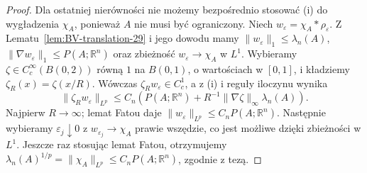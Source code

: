 \begin{proof}
Dla ostatniej nierówności nie możemy bezpośrednio
stosować (i) do wygładzenia $\chi_A$, ponieważ
$A$ nie musi być ograniczony. Niech
$w_\varepsilon=\chi_A*\rho_\varepsilon$.
Z Lematu~\ref{lem:BV-translation-29} i jego dowodu
mamy $\|w_\varepsilon\|_1\le\lambda_n(A)$,
$\|\nabla w_\varepsilon\|_1\le P(A;\mathbb R^n)$
oraz zbieżność $w_\varepsilon\to\chi_A$ w $L^1$.
Wybieramy $\zeta\in C_c^\infty(B(0,2))$
równą $1$ na $B(0,1)$, o wartościach w $[0,1]$,
i kładziemy $\zeta_R(x)=\zeta(x/R)$.
Wówczas $\zeta_R w_\varepsilon\in C_c^1$,
a z (i) i reguły iloczynu wynika
\[
 \|\zeta_R w_\varepsilon\|_{L^p}
 \le C_n\left(P(A;\mathbb R^n)
 +R^{-1}\|\nabla\zeta\|_\infty\lambda_n(A)\right).
\]
Najpierw $R\to\infty$; lemat Fatou daje
$\|w_\varepsilon\|_{L^p}\le C_nP(A;\mathbb R^n)$.
Następnie wybieramy $\varepsilon_j\downarrow0$
z $w_{\varepsilon_j}\to\chi_A$ prawie wszędzie,
co jest możliwe dzięki zbieżności w $L^1$.
Jeszcze raz stosując lemat Fatou, otrzymujemy
$\lambda_n(A)^{1/p}=\|\chi_A\|_{L^p}
\le C_nP(A;\mathbb R^n)$, zgodnie z tezą.
\end{proof}

